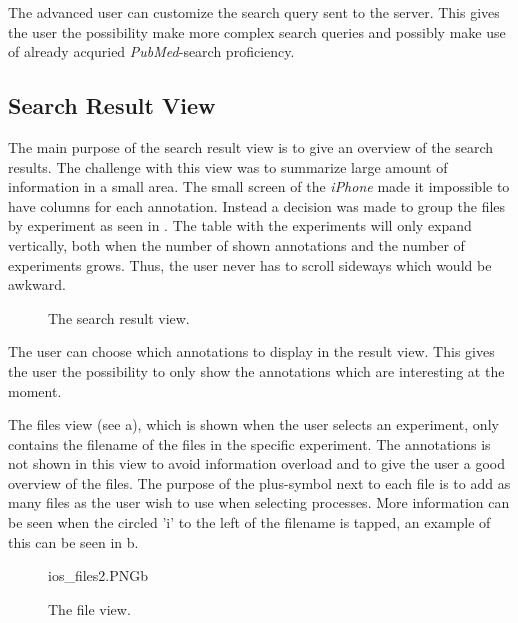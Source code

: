 The advanced user can customize the search query sent to the server. This gives the user the possibility make more complex search queries and possibly make use of already acquried \textit{PubMed}-search proficiency.

\subsection{Search Result View}
The main purpose of the search result view is to give an overview of the search results. The challenge with this view was to summarize large amount of information in a small area. The small screen of the \textit{iPhone} made it impossible to have columns for each annotation. Instead a decision was made to group the files by experiment as seen in . The table with the experiments will only expand vertically, both when the number of shown annotations and the number of experiments grows. Thus, the user never has to scroll sideways which would be awkward.

\begin{figure}[ht]
\caption{\footnotesize The search result view.}
\label{fig:ios_searchResult2}
\end{figure}
\FloatBarrier

The user can choose which annotations to display in the result view. This gives the user the possibility to only show the annotations which are interesting at the moment. 

The files view (see a), which is shown when the user selects an experiment, only contains the filename of the files in the specific experiment. The annotations is not shown in this view to avoid information overload and to give the user a good overview of the files. The purpose of the plus-symbol next to each file is to add as many files as the user wish to use when selecting processes. More information can be seen when the circled 'i' to the left of the filename is tapped, an example of this can be seen in b. 

\begin{figure}[h!]
		{ios_files2.PNG}{b}
\caption{\footnotesize The file view.}
\label{fig:ios_files2}
\end{figure}
\FloatBarrier



